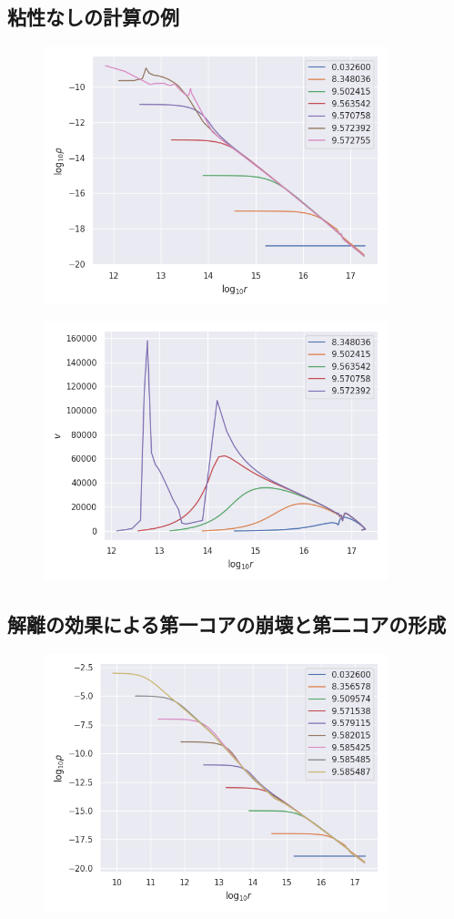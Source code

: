 \documentclass[a4j, dvipdfmx]{jsarticle}
\begin{document}
\subsection{粘性なしの計算の例}
\begin{figure}[H]
    \includegraphics[clip,width=10.0cm]{graph/noQ.png}
    \caption{}
    \label{fig:noQ}
\end{figure}
\begin{figure}[H]
    \includegraphics[clip,width=10.0cm]{graph/v_r_noQ.png}
    \caption{}
    \label{fig:v_r_noQ}
\end{figure}

\subsection{解離の効果による第一コアの崩壊と第二コアの形成}
\begin{figure}[H]
    \includegraphics[clip,width=10.0cm]{graph/rho_r.png}
    \caption{}
    \label{fig:rho_r}
\end{figure}
\end{document}
